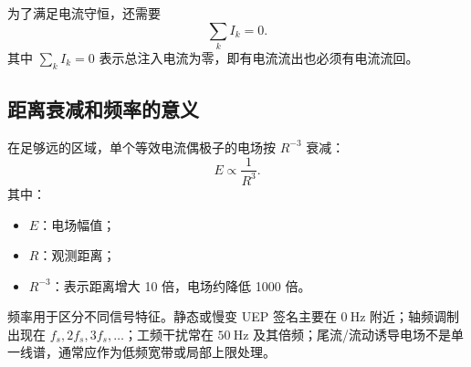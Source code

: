 为了满足电流守恒，还需要
\begin{equation}
    \sum_k I_k=0.
\end{equation}
其中 $\sum_k I_k=0$ 表示总注入电流为零，即有电流流出也必须有电流流回。

\subsection{距离衰减和频率的意义}

在足够远的区域，单个等效电流偶极子的电场按 $R^{-3}$ 衰减：
\begin{equation}
    E\propto \frac{1}{R^3}.
\end{equation}
其中：
\begin{itemize}
    \item $E$：电场幅值；
    \item $R$：观测距离；
    \item $R^{-3}$：表示距离增大 10 倍，电场约降低 1000 倍。
\end{itemize}

频率用于区分不同信号特征。静态或慢变 UEP 签名主要在 $0\ \mathrm{Hz}$ 附近；轴频调制出现在 $f_s,2f_s,3f_s,\ldots$；工频干扰常在 $50\ \mathrm{Hz}$ 及其倍频；尾流/流动诱导电场不是单一线谱，通常应作为低频宽带或局部上限处理。
